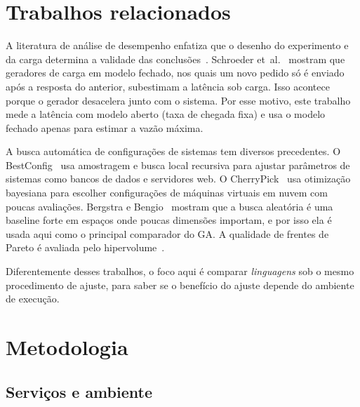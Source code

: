 \documentclass[11pt,a4paper]{article}
\begin{document}
\section{Trabalhos relacionados}

A literatura de análise de desempenho enfatiza que o desenho do experimento e da carga determina a validade das
conclusões~\cite{jain1991}. Schroeder et~al.~\cite{schroeder2006} mostram que geradores de carga em modelo fechado,
nos quais um novo pedido só é enviado após a resposta do anterior, subestimam a latência sob carga. Isso acontece
porque o gerador desacelera junto com o sistema. Por esse motivo, este trabalho mede a latência com modelo aberto
(taxa de chegada fixa) e usa o modelo fechado apenas para estimar a vazão máxima.

A busca automática de configurações de sistemas tem diversos precedentes. O BestConfig~\cite{zhu2017} usa amostragem
e busca local recursiva para ajustar parâmetros de sistemas como bancos de dados e servidores web. O
CherryPick~\cite{alipourfard2017} usa otimização bayesiana para escolher configurações de máquinas virtuais em nuvem
com poucas avaliações. Bergstra e Bengio~\cite{bergstra2012} mostram que a busca aleatória é uma baseline forte em
espaços onde poucas dimensões importam, e por isso ela é usada aqui como o principal comparador do GA. A qualidade de
frentes de Pareto é avaliada pelo hipervolume~\cite{zitzler1999}.

Diferentemente desses trabalhos, o foco aqui é comparar \emph{linguagens} sob o mesmo procedimento de ajuste, para
saber se o benefício do ajuste depende do ambiente de execução.

\section{Metodologia}

\subsection{Serviços e ambiente}
\end{document}
